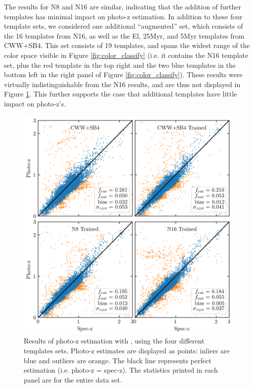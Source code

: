 The results for N8 and N16 are similar, indicating that the addition of further templates has minimal impact on photo-z estimation. 
In addition to these four template sets, we considered one additional ``augmented'' set, which consists of the 16 templates from N16, as well as the El, 25Myr, and 5Myr templates from CWW+SB4.
This set consists of 19 templates, and spans the widest range of the color space visible in Figure \ref{fig:color_classify} (i.e. it contains the N16 template set, plus the red template in the top right and the two blue templates in the bottom left in the right panel of Figure \ref{fig:color_classify}). 
These results were virtually indistinguishable from the N16 results, and are thus not displayed in Figure \ref{fig:photoz_results}.
This further supports the case that additional templates have little impact on photo-z's.

\begin{figure}
    \centering
    \includegraphics{photoz_results.png}
    \caption{Results of photo-z estimation with \bpz, using the four different templates sets. Photo-z estimates are displayed as points: inliers are blue and outliers are orange. The black line represents perfect estimation (i.e. photo-z = spec-z). The statistics printed in each panel are for the entire data set.}
    \label{fig:photoz_results}
\end{figure}

